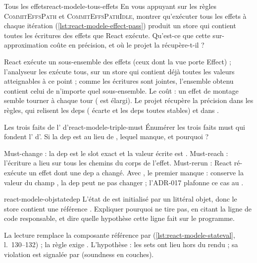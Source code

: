 \begin{exercice}{Tous les effets}{react-modele-tous-effets}
En vous appuyant sur les règles \textsc{CommitEffsPath} et
\textsc{CommitEffsPathIdle}, montrer qu'exécuter tous les effets à chaque
itération (\cref{lst:react-modele-effect-pass}) produit un store qui contient
toutes les écritures des effets que React exécute. Qu'est-ce que cette
sur-approximation coûte en précision, et où le projet la récupère-t-il ?
\end{exercice}
\begin{solution}
React exécute un sous-ensemble des effets (ceux dont la vue porte
\textsf{Effect}) ; l'analyseur les exécute tous, sur un store qui contient déjà
toutes les valeurs atteignables à ce point ; comme les écritures sont jointes,
l'ensemble obtenu contient celui de n'importe quel sous-ensemble. Le coût : un
effet de montage semble tourner à chaque tour ( est élargi). Le
projet récupère la précision dans les règles, qui relisent les deps
( écarte \code{[]} et les deps toutes stables) et dans
.
\end{solution}

\begin{exercice}{Les trois faits de l'\Error{} d'}{react-modele-triple-must}
Énumérer les trois faits must qui fondent l'\Error{} d'. Si la
dep est \code{[obj.a]} au lieu de \code{[obj]}, lequel manque, et pourquoi ?
\end{exercice}
\begin{solution}
Must-change : la dep est le slot exact et la valeur écrite est .
Must-reach : l'écriture a lieu sur tous les chemins du corps de l'effet.
Must-rerun : React ré-exécute un effet dont une dep a changé. Avec
\code{[obj.a]}, le premier manque :  conserve la valeur
du champ , la dep peut ne pas changer ; l'ADR-017 plafonne ce cas au
\Warning.
\end{solution}

\begin{exercice}{}{react-modele-objstatedep}
L'état de  est initialisé par un littéral objet, donc le store
contient une référence . Expliquer pourquoi
 ne tire pas, en citant la ligne de code
responsable, et dire quelle hypothèse cette ligne fait sur le programme.
\end{exercice}
\begin{solution}
La lecture  remplace la composante référence par
(\cref{lst:react-modele-stateval}, l.~130--132) ; la règle exige
. L'hypothèse : les sets ont lieu hors du rendu ; sa violation
est signalée par  (soundness en couches).
\end{solution}


